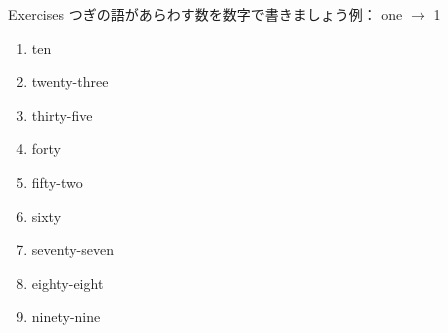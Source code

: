 \documentclass[aspectratio=169,xcolor={dvipsnames,table}]{beamer}
\begin{document}
\begin{frame}[plain]{Exercises}
 つぎの語があらわす数を数字で書きましょう\hspace{20pt}例： one $\rightarrow$ 1
\begin{enumerate}
 \item ten\hfill{}\hspace{250pt}\mbox{}
 \item twenty-three\hfill{}\hspace{250pt}\mbox{}
 \item thirty-five\hfill{}\hspace{250pt}\mbox{}
 \item forty\hfill{}\hspace{250pt}\mbox{}
 \item fifty-two\hfill{}\hspace{250pt}\mbox{}
 \item sixty\hfill{}\hspace{250pt}\mbox{}
 \item seventy-seven\hfill{}\hspace{250pt}\mbox{}
 \item eighty-eight\hfill{}\hspace{250pt}\mbox{}
 \item ninety-nine\hfill{}\hspace{250pt}\mbox{}
\end{enumerate}
\end{frame}
\end{document}
